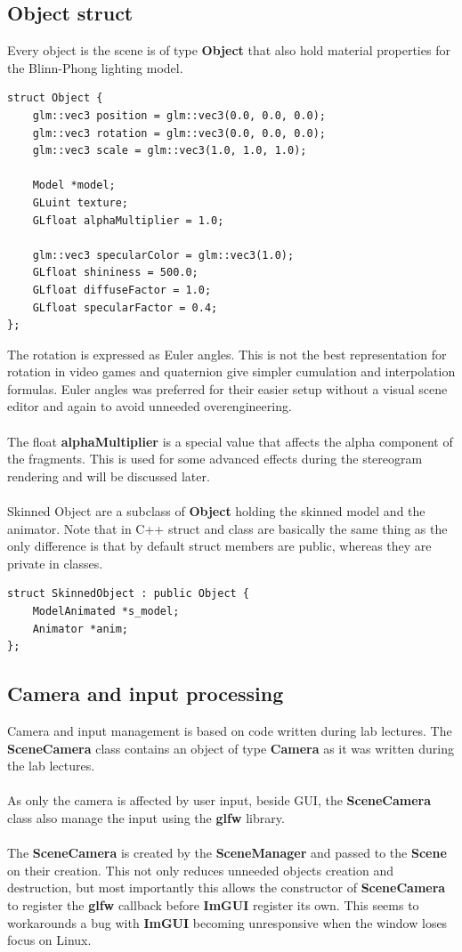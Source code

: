 \documentclass[12pt, a4paper]{article}
\begin{document}
\subsection{Object struct}
Every object is the scene is of type \textbf{Object} that also hold material properties for the Blinn-Phong lighting model.
\begin{lstlisting}[caption={Object struct},captionpos=b]
struct Object {
    glm::vec3 position = glm::vec3(0.0, 0.0, 0.0);
    glm::vec3 rotation = glm::vec3(0.0, 0.0, 0.0);
    glm::vec3 scale = glm::vec3(1.0, 1.0, 1.0);

    Model *model;
    GLuint texture;
    GLfloat alphaMultiplier = 1.0;

    glm::vec3 specularColor = glm::vec3(1.0);
    GLfloat shininess = 500.0;
    GLfloat diffuseFactor = 1.0;
    GLfloat specularFactor = 0.4;
};
\end{lstlisting}
The rotation is expressed as Euler angles. This is not the best representation for rotation in video games and quaternion
give simpler cumulation and interpolation formulas. Euler angles was preferred for their easier setup without a visual
scene editor and again to avoid unneeded overengineering.\\\\
The float \textbf{alphaMultiplier} is a special value that affects the alpha component of the fragments.
This is used for some advanced effects during the stereogram rendering and will be discussed later.\\\\
Skinned Object are a subclass of \textbf{Object} holding the skinned model and the animator. Note that in C++ struct and class
are basically the same thing as the only difference is that by default struct members are public, whereas they are private in classes.
\begin{lstlisting}[caption={SkinnedObject struct},captionpos=b]
struct SkinnedObject : public Object {
    ModelAnimated *s_model;
    Animator *anim;
};
\end{lstlisting}

\subsection{Camera and input processing}
Camera and input management is based on code written during lab lectures. The \textbf{SceneCamera} class contains
an object of type \textbf{Camera} as it was written during the lab lectures.\\\\
As only the camera is affected by user input, beside GUI, the \textbf{SceneCamera} class also manage the input
using the \textbf{glfw} library.\\\\
The \textbf{SceneCamera} is created by the \textbf{SceneManager} and passed to the \textbf{Scene} on
their creation. This not only reduces unneeded objects creation and destruction, but most importantly this allows
the constructor of \textbf{SceneCamera} to register the \textbf{glfw} callback before \textbf{ImGUI} register its own.
This seems to workarounds a bug with \textbf{ImGUI} becoming unresponsive when the window loses focus on Linux.  
\end{document}
